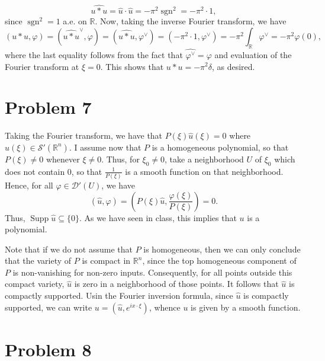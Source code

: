 \documentclass[10pt]{amsart}
\theoremstyle{thmstyle}
\theoremstyle{defstyle}
\newcommand{\R}{\mathbb{R}}
\newcommand{\sgn}{\operatorname{sgn}}
\newcommand{\Supp}{\operatorname{Supp}}
\newcommand{\scrS}{\mathscr S}
\newcommand{\wh}[1]{\widehat{#1}}
\begin{document}
\begin{equation*}
    \wh{u\ast u} = \wh u\cdot\wh u = -\pi^2\sgn^2 = -\pi^2\cdot 1,
\end{equation*}
since $\sgn^2 = 1$ a.e. on $\R$. Now, taking the inverse Fourier transform, we have 
\begin{equation*}
    (u\ast u, \varphi) = (\wh{u\ast u}^\vee,\varphi) = (\wh{u\ast u}, \varphi^\vee) = (-\pi^2\cdot 1, \varphi^\vee) = -\pi^2\int_{\R}\varphi^\vee = -\pi^2\varphi(0),
\end{equation*}
where the last equality follows from the fact that $\wh{\varphi^\vee} = \varphi$ and evaluation of the Fourier transform at $\xi = 0$. This shows that $u\ast u = -\pi^2\delta$, as desired.

\section{Problem 7}

Taking the Fourier transform, we have that $P(\xi)\wh u(\xi) = 0$ where $\wh u(\xi)\in\scrS'(\R^n)$. I assume now that $P$ is a homogeneous polynomial, so that $P(\xi)\ne 0$ whenever $\xi\ne 0$. Thus, for $\xi_0\ne 0$, take a neighborhood $U$ of $\xi_0$ which does not contain $0$, so that $\frac{1}{P(\xi)}$ is a smooth function on that neighborhood. Hence, for all $\varphi\in\mathscr D'(U)$, we have 
\begin{equation*}
    (\wh u, \varphi) = \left(P(\xi)\wh u, \frac{\varphi(\xi)}{P(\xi)}\right) = 0.
\end{equation*}
Thus, $\Supp\wh u\subseteq\{0\}$. As we have seen in class, this implies that $u$ is a polynomial.


Note that if we do not assume that $P$ is homogeneous, then we can only conclude that the variety of $P$ is compact in $\R^n$, since the top homogeneous component of $P$ is non-vanishing for non-zero inputs. Consequently, for all points outside this compact variety, $\wh u$ is zero in a neighborhood of those points. It follows that $\wh u$ is compactly supported. Usin the Fourier inversion formula, since $\wh u$ is compactly supported, we can write $u = (\wh u, e^{ix\cdot\xi})$, whence $u$ is given by a smooth function.

\section{Problem 8}
\end{document}
